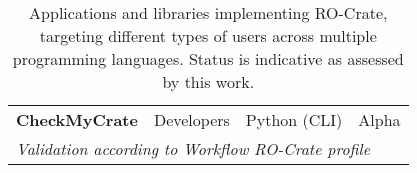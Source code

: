\begin{table}[htbp]
\begin{tabular}{llll}
        \textbf{CheckMyCrate} \citep{CheckMyCrate} & Developers & Python (CLI) & Alpha \\
        \multicolumn{4}{l}{\it Validation according to Workflow RO-Crate profile} \\

		\bottomrule
	\end{tabular}
	\caption{Applications and libraries implementing RO-Crate, targeting different types of users across multiple programming languages. Status is indicative as assessed by this work.}
	\label{tab:tools}
\end{table}